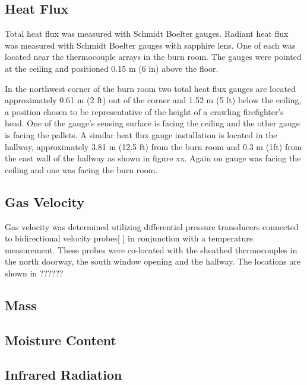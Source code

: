 \documentclass[12pt,oneside]{book}
\begin{document}
\subsection{Heat Flux}
\label{subsec:Heat_Flux}

Total heat flux was measured with Schmidt Boelter gauges.  Radiant heat flux was measured with Schmidt Boelter gauges with sapphire lens.  One of each was located near the thermocouple arrays in the burn room.  The gauges were pointed at the ceiling and positioned 0.15 m (6 in) above the floor.  

In the northwest corner of the burn room two total heat flux gauges are located approximately 0.61 m (2 ft) out of the corner and 1.52 m (5 ft) below the ceiling, a position chosen to be representative of the height of a crawling firefighter's head.  One of the gauge's sensing surface is facing the ceiling and the other gauge is facing the pallets.  A similar heat flux gauge installation is located in the hallway, approximately 3.81 m (12.5 ft) from the burn room and 0.3 m (1ft) from the east wall of the hallway as shown in figure xx.  Again on gauge was facing the ceiling and one was facing the burn room.  

\subsection{Gas Velocity}
\label{subsec:Gas_Velocity}

Gas velocity was determined utilizing differential pressure transducers connected to bidirectional velocity probes[ ] in conjunction with a temperature measurement.  These probes were co-located with the sheathed thermocouples in the north doorway, the south window opening and the hallway.  The locations are shown in ??????

\subsection{Mass}
\label{subsec:Mass}

\subsection{Moisture Content}
\label{subsec:Moisture_Content}

\subsection{Infrared Radiation}
\label{subsec:Infrared_Radiation}
\end{document}
